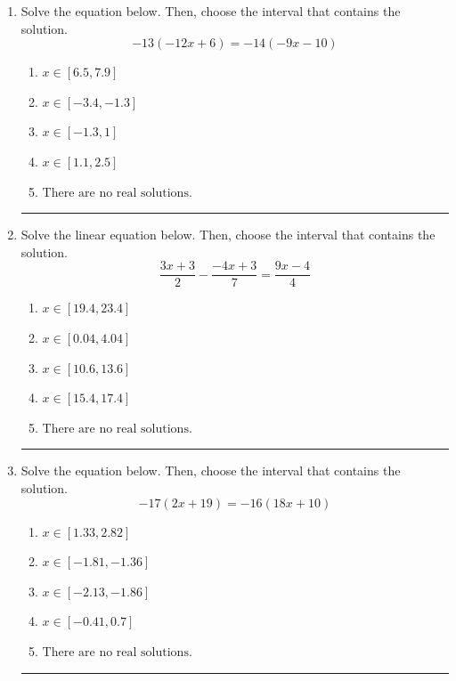 \documentclass[14pt]{extbook}
\newcommand{\litem}[1]{\item#1\hspace*{-1cm}\rule{\textwidth}{0.4pt}}
\begin{document}
\begin{enumerate}
\litem{
Solve the equation below. Then, choose the interval that contains the solution.\[ -13(-12x + 6) = -14(-9x -10) \]\begin{enumerate}[label=\Alph*.]
\item \( x \in [6.5, 7.9] \)
\item \( x \in [-3.4, -1.3] \)
\item \( x \in [-1.3, 1] \)
\item \( x \in [1.1, 2.5] \)
\item \( \text{There are no real solutions.} \)

\end{enumerate} }
\litem{
Solve the linear equation below. Then, choose the interval that contains the solution.\[ \frac{3x + 3}{2} - \frac{-4x + 3}{7} = \frac{9x -4}{4} \]\begin{enumerate}[label=\Alph*.]
\item \( x \in [19.4, 23.4] \)
\item \( x \in [0.04, 4.04] \)
\item \( x \in [10.6, 13.6] \)
\item \( x \in [15.4, 17.4] \)
\item \( \text{There are no real solutions.} \)

\end{enumerate} }
\litem{
Solve the equation below. Then, choose the interval that contains the solution.\[ -17(2x + 19) = -16(18x + 10) \]\begin{enumerate}[label=\Alph*.]
\item \( x \in [1.33, 2.82] \)
\item \( x \in [-1.81, -1.36] \)
\item \( x \in [-2.13, -1.86] \)
\item \( x \in [-0.41, 0.7] \)
\item \( \text{There are no real solutions.} \)


\end{enumerate}}
\end{enumerate}
\end{document}
